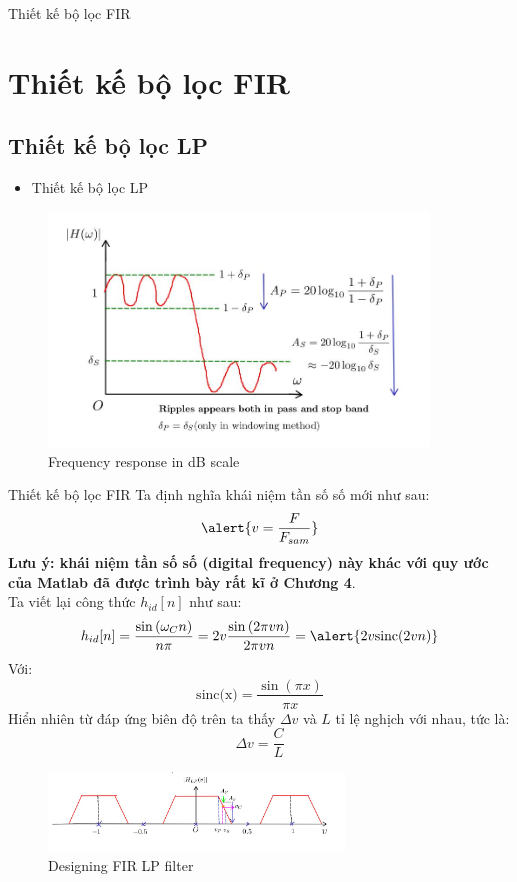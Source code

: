 \documentclass[8pt]{beamer}
\begin{document}
\begin{frame}{Thiết kế bộ lọc FIR}
	\section{Thiết kế bộ lọc FIR}
	\subsection{Thiết kế bộ lọc LP}
	\begin{itemize}
		\item Thiết kế bộ lọc LP
	\end{itemize}
	\begin{figure}[h]
		\includegraphics[width=0.9\textwidth]{6.jpg}
		\caption{Frequency response in dB scale}			\label{fig:re7}
	\end{figure}
\end{frame}
\begin{frame}{Thiết kế bộ lọc FIR}
	Ta định nghĩa khái niệm \alert{tần số số} mới như sau:
	$$\alert{v=\frac{F}{F_{sam}}}$$
	\textbf{Lưu ý: khái niệm tần số số (digital frequency) này khác với quy ước của Matlab đã được trình bày rất kĩ ở \alert{Chương 4}}.
	\\ Ta viết lại công thức $h_{id}[n]$ như sau:
	$$h_{id}[n]=\frac{\sin{(\omega_{C}n)}}{n\pi}=2v\frac{\sin{(2\pi v n)}}{2\pi vn}=\alert{2v\text{sinc}(2vn)}$$
	Với: $$\text{sinc(x)}=\frac{\sin{(\pi x)}}{\pi x}$$
	Hiển nhiên từ đáp ứng biên độ trên ta thấy $\Delta v$ và $L$ tỉ lệ \alert{nghịch} với nhau, tức là: $$\Delta v=\frac{C}{L}$$
	\begin{figure}[h]
		\includegraphics[width=0.7\textwidth]{7.jpg}
		\caption{Designing FIR LP filter}			\label{fig:re8}
	\end{figure}
\end{frame}
\end{document}

